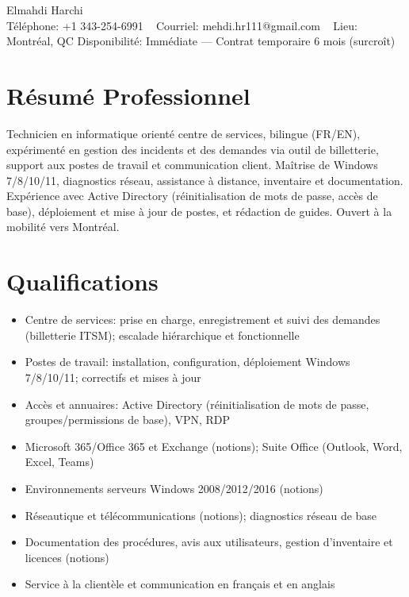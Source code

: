 \documentclass[letterpaper,11pt]{article}
\begin{document}
\begin{center}
    {\Large Elmahdi Harchi} \\[2mm]
    \footnotesize
    Téléphone: +1 343-254-6991 ~ 
    Courriel: mehdi.hr111@gmail.com ~ 
    Lieu: Montréal, QC
    Disponibilité: Immédiate — Contrat temporaire 6 mois (surcroît)
    \vspace{-8pt}
\end{center}

\section{Résumé Professionnel}
\vspace{1pt}
Technicien en informatique orienté centre de services, bilingue (FR/EN), expérimenté en gestion des incidents et des demandes via outil de billetterie, support aux postes de travail et communication client. Maîtrise de Windows 7/8/10/11, diagnostics réseau, assistance à distance, inventaire et documentation. Expérience avec Active Directory (réinitialisation de mots de passe, accès de base), déploiement et mise à jour de postes, et rédaction de guides. Ouvert à la mobilité vers Montréal.
\vspace{-12pt}

\section{Qualifications}
\vspace{1mm}
\begin{itemize}
  \item Centre de services: prise en charge, enregistrement et suivi des demandes (billetterie ITSM); escalade hiérarchique et fonctionnelle
  \item Postes de travail: installation, configuration, déploiement Windows 7/8/10/11; correctifs et mises à jour
  \item Accès et annuaires: Active Directory (réinitialisation de mots de passe, groupes/permissions de base), VPN, RDP
  \item Microsoft 365/Office 365 et Exchange (notions); Suite Office (Outlook, Word, Excel, Teams)
  \item Environnements serveurs Windows 2008/2012/2016 (notions)
  \item Réseautique et télécommunications (notions); diagnostics réseau de base
  \item Documentation des procédures, avis aux utilisateurs, gestion d'inventaire et licences (notions)
  \item Service à la clientèle et communication en français et en anglais
\end{itemize}
\vspace{-12pt}
\end{document}
